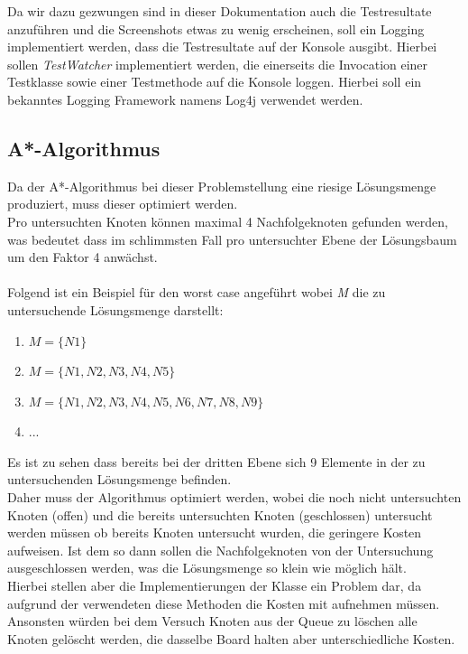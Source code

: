 \documentclass[11pt, a4paper, twoside]{article}   	%
\begin{document}
Da wir dazu gezwungen sind in dieser Dokumentation auch die Testresultate anzuführen und die Screenshots etwas zu wenig erscheinen, soll ein Logging implementiert werden, dass die Testresultate auf der Konsole ausgibt. Hierbei sollen \emph{TestWatcher} implementiert werden, die einerseits die Invocation einer Testklasse sowie einer Testmethode auf die Konsole loggen. Hierbei soll ein bekanntes Logging Framework namens Log4j verwendet werden.


\subsection{A*-Algorithmus}
Da der A*-Algorithmus bei dieser Problemstellung eine riesige Lösungsmenge produziert, muss dieser optimiert werden.\\
Pro untersuchten Knoten können maximal 4 Nachfolgeknoten gefunden werden, was bedeutet dass im schlimmsten Fall pro untersuchter Ebene der Lösungsbaum um den Faktor 4 anwächst.\\\\
Folgend ist ein Beispiel für den worst case angeführt wobei \emph{M} die zu untersuchende Lösungsmenge darstellt:
\begin{enumerate}
	\item $M=\{N1\}$
	\item $M=\{N1, N2, N3, N4, N5\}$
	\item $M=\{N1, N2, N3, N4, N5, N6, N7, N8, N9\}$
	\item ...
\end{enumerate}
Es ist zu sehen dass bereits bei der dritten Ebene sich 9 Elemente in der zu untersuchenden Lösungsmenge befinden.\\
Daher muss der Algorithmus optimiert werden, wobei die noch nicht untersuchten Knoten (offen) und die bereits untersuchten Knoten (geschlossen) untersucht werden müssen ob bereits Knoten untersucht wurden, die geringere Kosten aufweisen. Ist dem so dann sollen die Nachfolgeknoten von der Untersuchung ausgeschlossen werden, was die Lösungsmenge so klein wie möglich hält.\\
Hierbei stellen aber die Implementierungen  der Klasse  ein Problem dar, da aufgrund der verwendeten  diese Methoden die Kosten mit aufnehmen müssen.\\
Ansonsten würden bei dem Versuch Knoten aus der Queue zu löschen alle Knoten gelöscht werden, die dasselbe Board halten aber unterschiedliche Kosten.\\
\end{document}
